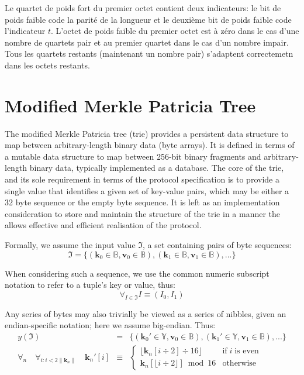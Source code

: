 \documentclass[9pt,oneside]{amsart}
\begin{document}
Le quartet de poids fort du premier octet contient deux indicateurs: le bit de poids faible code la parité de la longueur et le deuxième bit de poids faible code l'indicateur $t$. L'octet de poids faible du premier octet est à zéro dans le cas d'une nombre de quartets pair et au premier quartet dans le cas d'un nombre impair. Tous les quartets restants (maintenant un nombre pair) s'adaptent correctemetn dans les octets restants.

\section{Modified Merkle Patricia Tree}\label{app:trie}
The modified Merkle Patricia tree (trie) provides a persistent data structure to map between arbitrary-length binary data (byte arrays). It is defined in terms of a mutable data structure to map between 256-bit binary fragments and arbitrary-length binary data, typically implemented as a database. The core of the trie, and its sole requirement in terms of the protocol specification is to provide a single value that identifies a given set of key-value pairs, which may be either a 32 byte sequence or the empty byte sequence. It is left as an implementation consideration to store and maintain the structure of the trie in a manner the allows effective and efficient realisation of the protocol.

Formally, we assume the input value $\mathfrak{I}$, a set containing pairs of byte sequences:
\begin{equation}
\mathfrak{I} = \{ (\mathbf{k}_0 \in \mathbb{B}, \mathbf{v}_0 \in \mathbb{B}), (\mathbf{k}_1 \in \mathbb{B}, \mathbf{v}_1 \in \mathbb{B}), ... \}
\end{equation}

When considering such a sequence, we use the common numeric subscript notation to refer to a tuple's key or value, thus:
\begin{equation}
\forall_{I \in \mathfrak{I}} I \equiv (I_0, I_1)
\end{equation}

Any series of bytes may also trivially be viewed as a series of nibbles, given an endian-specific notation; here we assume big-endian. Thus:
\begin{eqnarray}
y(\mathfrak{I}) & = & \{ (\mathbf{k}_0' \in \mathbb{Y}, \mathbf{v}_0 \in \mathbb{B}), (\mathbf{k}_1' \in \mathbb{Y}, \mathbf{v}_1 \in \mathbb{B}), ... \} \\
\forall_n \quad \forall_{i: i < 2\lVert\mathbf{k}_n\rVert} \quad \mathbf{k}_n'[i] & \equiv &
\begin{cases}
\lfloor \mathbf{k}_n[i \div 2] \div 16 \rfloor & \text{if} \; i \; \text{is even} \\
\mathbf{k}_n[\lfloor i \div 2 \rfloor] \bmod 16 & \text{otherwise}
\end{cases}
\end{eqnarray}
\end{document}
